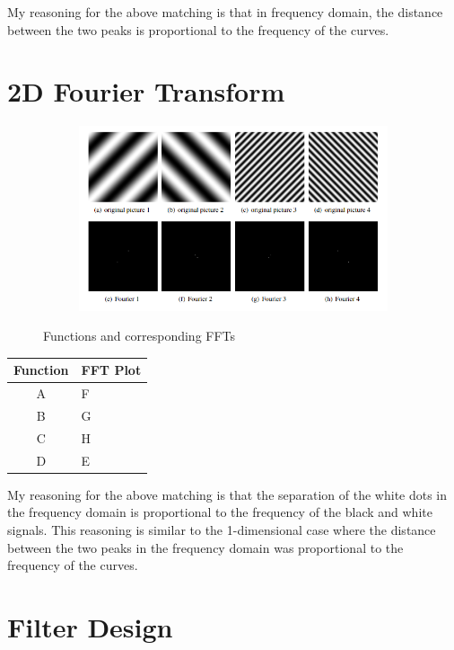 \documentclass[12pt, oneside]{article}
\begin{document}
My reasoning  for the above matching is that in frequency domain, 
the distance between the two peaks is proportional to the frequency of
the curves.

\section{2D Fourier Transform}


\begin{figure}[H]
    \centering
    \begin{subfigure}[b]{1\textwidth}
        \centering
        \includegraphics[width=\textwidth]{imgs/q6_matching.png}
    \end{subfigure}
    \caption{Functions and corresponding FFTs}
\end{figure}

\begin{table}[H]
    \centering
    \begin{tabular}{|c|l|}
    \hline
    \multicolumn{1}{|l|}{\textbf{Function}} & \textbf{FFT Plot} \\ \hline
    A                                       & F                 \\ \hline
    B                                       & G                 \\ \hline
    C                                       & H                 \\ \hline
    D                                       & E                 \\ \hline
    \end{tabular}
\end{table}

My reasoning  for the above matching is that the separation of the white dots 
in the frequency domain is proportional to the frequency of the black and white
signals. This reasoning is similar to the 1-dimensional case where 
the distance between the two peaks in the frequency domain was 
proportional to the frequency of the curves.

\section{Filter Design}
\end{document}
